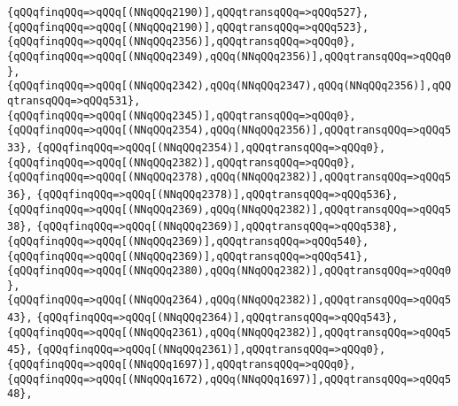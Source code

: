 \verb|{qQQqfinqQQq=>qQQq[(NNqQQq2190)],qQQqtransqQQq=>qQQq527},|\newline
\verb|{qQQqfinqQQq=>qQQq[(NNqQQq2190)],qQQqtransqQQq=>qQQq523},|\newline
\verb|{qQQqfinqQQq=>qQQq[(NNqQQq2356)],qQQqtransqQQq=>qQQq0},|\newline
\verb|{qQQqfinqQQq=>qQQq[(NNqQQq2349),qQQq(NNqQQq2356)],qQQqtransqQQq=>qQQq0},|\newline
\verb|{qQQqfinqQQq=>qQQq[(NNqQQq2342),qQQq(NNqQQq2347),qQQq(NNqQQq2356)],qQQqtransqQQq=>qQQq531},|\newline
\verb|{qQQqfinqQQq=>qQQq[(NNqQQq2345)],qQQqtransqQQq=>qQQq0},|\newline
\verb|{qQQqfinqQQq=>qQQq[(NNqQQq2354),qQQq(NNqQQq2356)],qQQqtransqQQq=>qQQq533},|\newline
\verb|{qQQqfinqQQq=>qQQq[(NNqQQq2354)],qQQqtransqQQq=>qQQq0},|\newline
\verb|{qQQqfinqQQq=>qQQq[(NNqQQq2382)],qQQqtransqQQq=>qQQq0},|\newline
\verb|{qQQqfinqQQq=>qQQq[(NNqQQq2378),qQQq(NNqQQq2382)],qQQqtransqQQq=>qQQq536},|\newline
\verb|{qQQqfinqQQq=>qQQq[(NNqQQq2378)],qQQqtransqQQq=>qQQq536},|\newline
\verb|{qQQqfinqQQq=>qQQq[(NNqQQq2369),qQQq(NNqQQq2382)],qQQqtransqQQq=>qQQq538},|\newline
\verb|{qQQqfinqQQq=>qQQq[(NNqQQq2369)],qQQqtransqQQq=>qQQq538},|\newline
\verb|{qQQqfinqQQq=>qQQq[(NNqQQq2369)],qQQqtransqQQq=>qQQq540},|\newline
\verb|{qQQqfinqQQq=>qQQq[(NNqQQq2369)],qQQqtransqQQq=>qQQq541},|\newline
\verb|{qQQqfinqQQq=>qQQq[(NNqQQq2380),qQQq(NNqQQq2382)],qQQqtransqQQq=>qQQq0},|\newline
\verb|{qQQqfinqQQq=>qQQq[(NNqQQq2364),qQQq(NNqQQq2382)],qQQqtransqQQq=>qQQq543},|\newline
\verb|{qQQqfinqQQq=>qQQq[(NNqQQq2364)],qQQqtransqQQq=>qQQq543},|\newline
\verb|{qQQqfinqQQq=>qQQq[(NNqQQq2361),qQQq(NNqQQq2382)],qQQqtransqQQq=>qQQq545},|\newline
\verb|{qQQqfinqQQq=>qQQq[(NNqQQq2361)],qQQqtransqQQq=>qQQq0},|\newline
\verb|{qQQqfinqQQq=>qQQq[(NNqQQq1697)],qQQqtransqQQq=>qQQq0},|\newline
\verb|{qQQqfinqQQq=>qQQq[(NNqQQq1672),qQQq(NNqQQq1697)],qQQqtransqQQq=>qQQq548},|\newline
